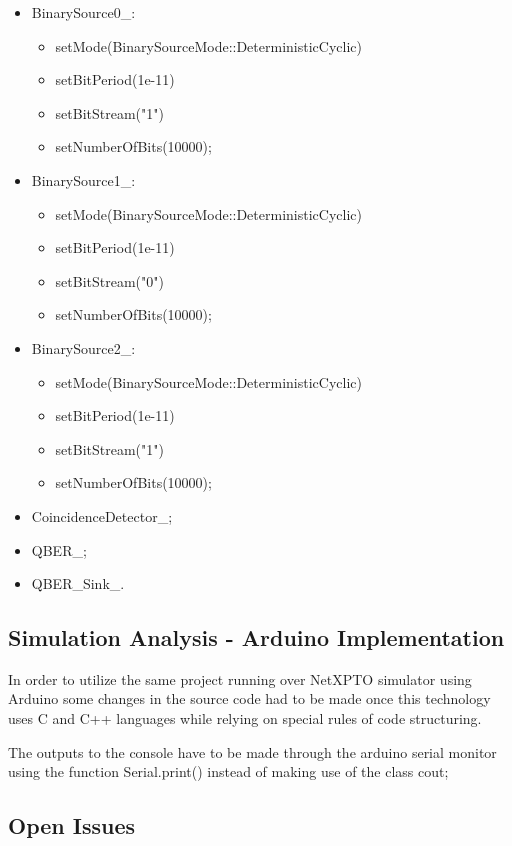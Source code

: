 \begin{refsection}
\begin{itemize}
	\item BinarySource0\_:
	\begin{itemize}
		\item setMode(BinarySourceMode::DeterministicCyclic)
		\item setBitPeriod(1e-11)
		\item setBitStream("1")
		\item setNumberOfBits(10000);
	\end{itemize}
	\clearpage
	\item BinarySource1\_:
	\begin{itemize}
		\item setMode(BinarySourceMode::DeterministicCyclic)
		\item setBitPeriod(1e-11)
		\item setBitStream("0")
		\item setNumberOfBits(10000);
	\end{itemize}
	
	\item BinarySource2\_:
	\begin{itemize}
		\item setMode(BinarySourceMode::DeterministicCyclic)
		\item setBitPeriod(1e-11)
		\item setBitStream("1")
		\item setNumberOfBits(10000);
	\end{itemize}
	
	\item CoincidenceDetector\_;
	
	\item QBER\_;
	
	\item QBER\_Sink\_.
\end{itemize}





\subsection{Simulation Analysis - Arduino Implementation}

In order to utilize the same project running over NetXPTO simulator using Arduino some changes in the source code had to be made once this technology uses C and C++ languages while relying on special rules of code structuring.

The outputs to the console have to be made through the arduino serial monitor using the function Serial.print() instead of making use of the class cout; 

\subsection{Open Issues}

\clearpage
\printbibliography[heading=subbibliography]
\end{refsection}
\cleardoublepage

